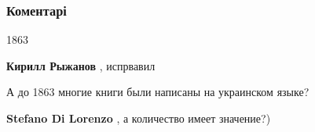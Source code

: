  
 
 
 
 
\subsubsection{Коментарі}

\begin{itemize}
 
1863

\begin{itemize}
 
\textbf{Кирилл Рыжанов} , испрвавил
\end{itemize}

 
А до 1863 многие книги были написаны на украинском языке?
\begin{itemize}
 
\textbf{Stefano Di Lorenzo} , а количество имеет значение?)

 

\end{itemize}
\end{itemize}
